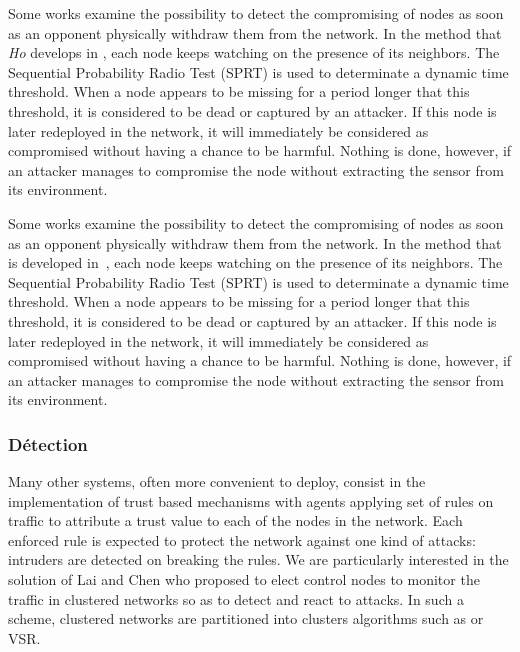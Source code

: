
Some works examine the possibility to detect the compromising of nodes as soon as an opponent physically withdraw them from the network.
In the method that \textit{Ho} develops in
\cite{Ho10},
each node keeps watching on the presence of its neighbors.
The Sequential Probability Radio Test (SPRT) is used to determinate a dynamic time threshold.
When a node appears to be missing for a period longer that this threshold, it is considered to be dead or captured by an attacker.
If this node is later redeployed in the network, it will immediately be considered as compromised without having a chance to be harmful.
Nothing is done, however, if an attacker manages to compromise the node without extracting the sensor from its environment.

Some works examine the possibility to detect the compromising of nodes as soon as an opponent physically withdraw them from the network.
In the method that is developed in~\cite{Ho10}, each node keeps watching on the presence of its neighbors.
The Sequential Probability Radio Test (SPRT) is used to determinate a dynamic time threshold.
When a node appears to be missing for a period longer that this threshold, it is considered to be dead or captured by an attacker.
If this node is later redeployed in the network, it will immediately be considered as compromised without having a chance to be harmful.
Nothing is done, however, if an attacker manages to compromise the node without extracting the sensor from its environment.


\subsubsection{Détection}

\cite{HI12}

Many other systems, often more convenient to deploy, consist in the implementation of trust based mechanisms\cite{MC10,F-GRL07} with agents applying set of rules\cite{RKKK13} on traffic to attribute a trust value to each of the nodes in the network.
Each enforced rule is expected to protect the network against one kind of attacks: intruders are detected on breaking the rules.
We are particularly interested in the solution of Lai and Chen\cite{LC08} who proposed to elect control nodes to monitor the traffic in clustered networks so as to detect and react to \dos attacks.
In such a scheme, clustered networks are partitioned into clusters \via algorithms such as \leach\cite{HHT02} or VSR\cite{TV08}.


